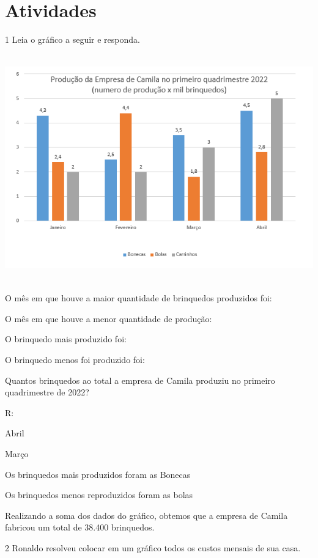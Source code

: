 {\section{Atividades}

\num{1} Leia o gráfico a seguir e responda.

\includegraphics[width=5.90625in,height=3.86458in]{./imgSAEB_8_MAT/media/image39.png}
\item O mês em que houve a maior quantidade de brinquedos produzidos foi:
\item O mês em que houve a menor quantidade de produção:
\item O brinquedo mais produzido foi:
\item O brinquedo menos foi produzido foi:
\item Quantos brinquedos ao total a empresa de Camila produziu no primeiro
quadrimestre de 2022?

R:
\item Abril
\item Março
\item Os brinquedos mais produzidos foram as Bonecas
\item Os brinquedos menos reproduzidos foram as bolas
\item Realizando a soma dos dados do gráfico, obtemos que a empresa de
Camila fabricou um total de 38.400 brinquedos.

\num{2} Ronaldo resolveu colocar em um gráfico todos os custos mensais de sua
casa.

}
